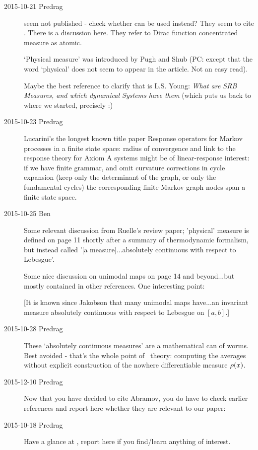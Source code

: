 \begin{description}

\item[2015-10-21 Predrag]
 seem not published - check whether
 can be used instead? They seem to cite
. There is a discussion
{here}. They refer to Dirac function concentrated measure  as atomic.

`Physical measure' was introduced by Pugh and Shub (PC:
except that the word `physical' does not seem to appear in the article.
Not an easy read).

Maybe the best reference to clarify that is L.S. Young:
\emph{What are SRB Measures, and which dynamical Systems have them}
(which puts us back to where we started, precisely :)

\item[2015-10-23 Predrag]
Lucarini's the longest known title paper
{\rf Response operators for {Markov} processes in a finite state
             space: radius of convergence and link to
             the response theory for {Axiom A} systems}
might be of linear-response interest: if we have finite grammar, and omit
curvature corrections in cycle expansion (keep only the determinant of
the graph, or only the fundamental cycles) the corresponding finite
Markov graph nodes span a finite state space.

\item[2015-10-25 Ben]
Some relevant discussion from Ruelle's review paper; 'physical'
measure is defined on page 11 shortly after a summary of
thermodynamic formalism, but instead called
'[a measure]...absolutely continuous with respect to Lebesgue'.

Some nice discussion on unimodal maps on page 14 and beyond...but mostly
contained in other references. One interesting point:

[It is known since Jakobson that many unimodal maps
have...an invariant measure absolutely continuous with respect to
Lebesgue on $[a,b]$.]


\item[2015-10-28 Predrag]
These `absolutely continuous measures' are a mathematical can of worms.
Best avoided - that's the whole point of \po\ theory: computing the
averages without explicit construction of the nowhere differentiable
measure ${\rho}(x)$.

\item[2015-12-10 Predrag]
Now that you have decided to cite Abramov, you do have to
check earlier references and report here whether they are relevant to our
paper:

\item[2015-10-18 Predrag]
Have a glance at
,
report here if you find/learn anything of interest.



\end{description}
